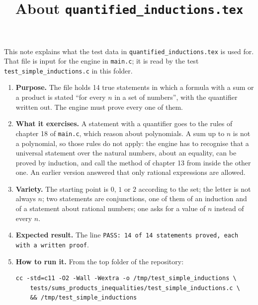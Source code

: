 \documentclass[11pt,a4paper]{article}
\title{About \texttt{quantified\_inductions.tex}}
\author{}
\date{}
\begin{document}
\maketitle
This note explains what the test data in \texttt{quantified\_inductions.tex} is used for. That file is input for the engine in \texttt{main.c}; it is read by the test \texttt{test\_simple\_inductions.c} in this folder.

\begin{enumerate}
\item \textbf{Purpose.} The file holds 14 true statements in which a formula with a sum or a product is stated ``for every $n$ in a set of numbers'', with the quantifier written out. The engine must prove every one of them.

\item \textbf{What it exercises.} A statement with a quantifier goes to the rules of chapter 18 of \texttt{main.c}, which reason about polynomials. A sum up to $n$ is not a polynomial, so those rules do not apply: the engine has to recognise that a universal statement over the natural numbers, about an equality, can be proved by induction, and call the method of chapter 13 from inside the other one. An earlier version answered that only rational expressions are allowed.

\item \textbf{Variety.} The starting point is $0$, $1$ or $2$ according to the set; the letter is not always $n$; two statements are conjunctions, one of them of an induction and of a statement about rational numbers; one asks for a value of $n$ instead of every $n$.

\item \textbf{Expected result.} The line \texttt{PASS: 14 of 14 statements proved, each with a written proof}.

\item \textbf{How to run it.} From the top folder of the repository:
\begin{verbatim}
cc -std=c11 -O2 -Wall -Wextra -o /tmp/test_simple_inductions \
    tests/sums_products_inequalities/test_simple_inductions.c \
    && /tmp/test_simple_inductions
\end{verbatim}
\end{enumerate}
\end{document}
